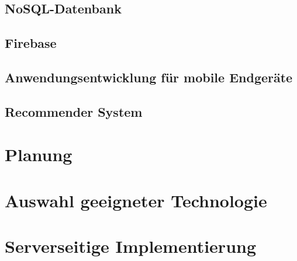 \documentclass[11pt,a4paper]{article}
\begin{document}
\clearpage
\subsection{NoSQL-Datenbank}

\clearpage
\subsection{Firebase}
\label{sec:firebase}

\subsection{Anwendungsentwicklung für mobile Endgeräte}

\subsection{Recommender System}
\label{sec:recomandationSystem}


\clearpage
\section{Planung}



\clearpage
\section{Auswahl geeigneter Technologie}


\clearpage
\section{Serverseitige Implementierung}


\clearpage
\end{document}
